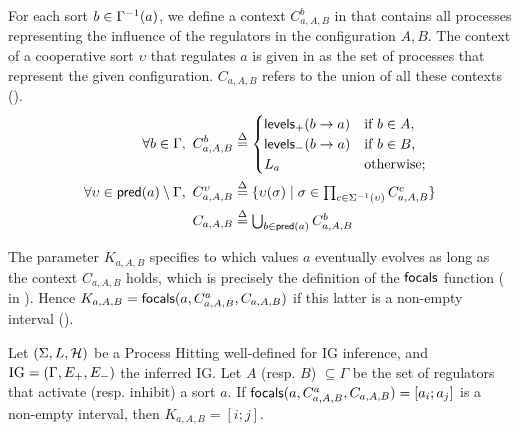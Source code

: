 For each sort $b \in \Gamma^{-1}(a)$, we define a context $C^b_{a,A,B}$ in  that contains all processes representing the influence of the regulators in the configuration $A,B$.
The context of a cooperative sort $\upsilon$ that regulates $a$ is given in  as the set of processes that represent the given configuration.
$C_{a,A,B}$ refers to the union of all these contexts ().
\begin{align}
\label{eq:param_context}
\forall b\in\Gamma,~
C_{a,A,B}^b & \stackrel{\Delta}= \begin{cases}
\mathsf{levels}_+(b\rightarrow a) & \text{if $b \in A$,}\\
\mathsf{levels}_-(b\rightarrow a) & \text{if $b \in B$,}\\
L_a		& \text{otherwise;}\\
\end{cases}
\\
\label{eq:param_context_coop}
\forall \upsilon \in \mathsf{pred}(a)\setminus\Gamma,~
C_{a,A,B}^\upsilon & \stackrel{\Delta}= \{
\upsilon(\sigma) \mid \sigma \in \textstyle\prod_{c\in\Sigma^{-1}(\upsilon)}C_{a,A,B}^c \}
\\
C_{a,A,B} & \stackrel{\Delta}= \textstyle\bigcup_{b\in\mathsf{pred}(a)} C^b_{a,A,B}
\label{eq:K-ctx}
\end{align}

The parameter $K_{a,A,B}$ specifies to which values $a$ eventually evolves as long as the context
$C_{a,A,B}$ holds, which is precisely the definition of the $\mathsf{focals}$ function
( in ).
Hence $K_{a,A,B} = \mathsf{focals}(a,C^a_{a,A,B},C_{a,A,B})$ if this latter is a non-empty interval
().

\begin{proposition}
\label{pps:param_K}
Let $(\Sigma, L, \mathcal{H})$ be a Process Hitting well-defined for IG inference, and $\mathrm{IG} = (\Gamma,
E_+, E_-)$ the inferred IG.
Let $A$ (resp. $B$) $\subseteq \Gamma$ be the set of regulators that activate (resp. inhibit) a sort
$a$.
If $\mathsf{focals}(a,C^a_{a,A,B},C_{a,A,B})=[a_i;a_j]$ is a non-empty interval, 
	then $K_{a,A,B} = [i;j]$.
\end{proposition}

